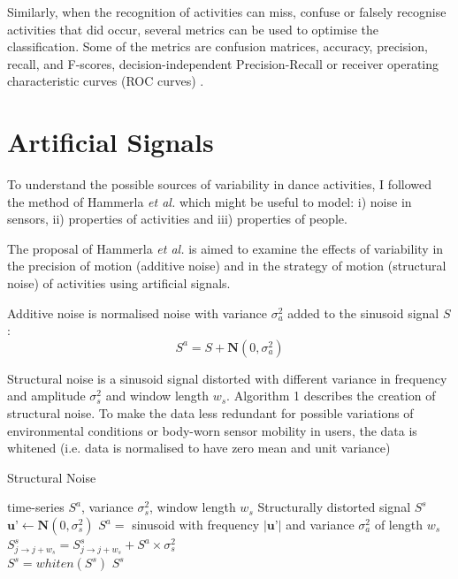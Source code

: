 \documentclass[10pt,journal,compsoc]{IEEEtran}
\begin{document}
Similarly, when the recognition of activities can miss, confuse or falsely
recognise activities that did occur, several metrics
can be used to optimise the classification. Some of the metrics
are confusion matrices, accuracy, precision, recall, and F-scores,
decision-independent Precision-Recall or receiver operating characteristic
curves (ROC curves) \cite{bulling2014}.


\section{Artificial Signals}
To understand the possible sources of variability
in dance activities, I followed the method of Hammerla
\emph{et al.} \cite{hammerla2011} which might be useful to model:
i) noise in sensors,
ii) properties of activities and
iii) properties of people.

The proposal of Hammerla \emph{et al.} \cite{hammerla2011}
is aimed to examine the effects of
variability in the precision of motion  (additive noise)
and in the strategy of motion  (structural noise) of
activities using artificial signals.

Additive noise is normalised noise with variance $\sigma_a ^2$ added to the
sinusoid signal $S$:
\begin{equation}
 S^a = S + \textbf{N}(0, \sigma_a ^2)
\end{equation}

Structural noise is a sinusoid signal distorted with different variance
in frequency and amplitude $\sigma_s ^2$ and window length $w_s$.
Algorithm 1 describes the creation of structural noise.
To make the data less redundant for possible variations of environmental
conditions or body-worn sensor mobility in users, the data is whitened
(i.e. data is normalised to have zero mean and unit variance)


\begin{algorithm}[H]
\caption{Structural Noise}
\begin{algorithmic}[1]
 \renewcommand{\algorithmicrequire}{\textbf{Input:}}
 \renewcommand{\algorithmicensure}{\textbf{Output:}}
 \REQUIRE time-series $S^a$, variance $\sigma_s ^2$, window length $w_s$
 \ENSURE  Structurally distorted signal $S^s$
  \STATE $\textbf{u'} \leftarrow \textbf{N}(0, \sigma_s ^2)$
  \STATE $S^{a} =$ sinusoid with frequency $| \textbf{u'} |$ and variance $\sigma_a ^2$ of length $w_s$
  \STATE $S^s_{j \rightarrow j+w_s}  = S^s_{j \rightarrow j+w_s}  + S^{a} \times   \sigma_s ^2 $
  \ENDFOR
  \\ $S^s= whiten (S^s)$
 \RETURN $S^s$
\end{algorithmic}
\end{algorithm}
\end{document}
